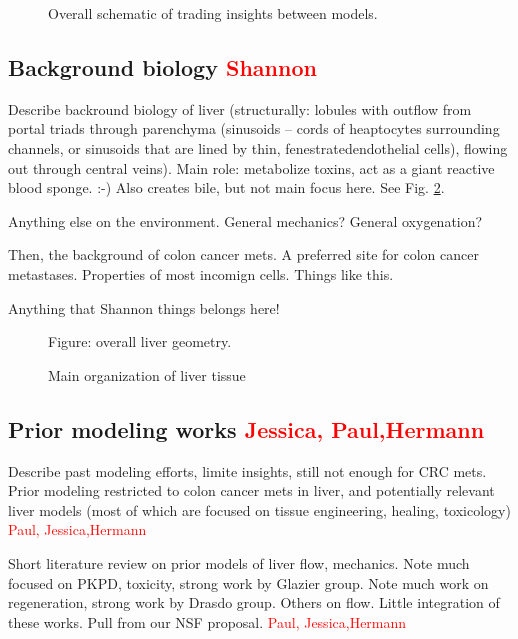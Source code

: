 \documentclass[smallextended,natbib,draft]{svjour3}
\newcommand{\red}[1]{\textcolor{red}{#1}}
\begin{document}
\begin{figure}\sidecaption 
\caption{Overall schematic of trading insights between models.}
\label{fig:multiscale_models}
\end{figure}



\subsection{Background biology \red{Shannon}}
Describe backround biology of liver (structurally: lobules with outflow from portal triads through parenchyma (sinusoids -- cords of heaptocytes surrounding channels, or sinusoids that are lined by thin, fenestratedendothelial cells), flowing out through central veins). Main role: metabolize toxins, act as a giant reactive blood sponge. :-) Also creates bile, but not main focus here.  
See Fig. \ref{fig:liver_schematic}. 

Anything else on the environment. General mechanics? General oxygenation? 

Then, the background of colon cancer mets. A preferred site for colon cancer metastases. Properties of most incomign cells. Things like this. 

Anything that Shannon things belongs here! 

\begin{figure}[tbh]
Figure: overall liver geometry. 
\caption{Main organization of liver tissue} 
\label{fig:liver_schematic}
\end{figure}

\subsection{Prior modeling works \red{Jessica, Paul,Hermann}}
Describe past modeling efforts, limite insights, still not enough for CRC mets. Prior modeling restricted to colon cancer mets in 
liver, and potentially relevant liver models (most of which are focused on tissue engineering, healing, toxicology) \red{Paul, Jessica,Hermann}


Short literature review on prior models of liver flow, mechanics. 
Note much focused on PKPD, toxicity, strong work by Glazier group. 
Note much work on regeneration, strong work by Drasdo group. 
Others on flow. 
Little integration of these works. 
Pull from our NSF proposal. \red{Paul, Jessica,Hermann}
\end{document}
